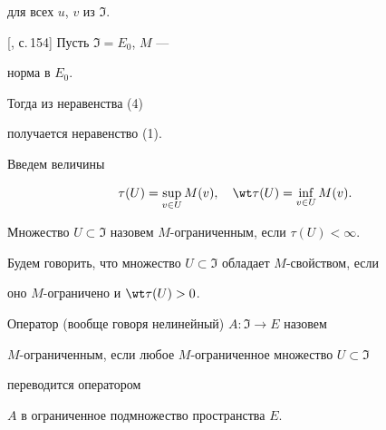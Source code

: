 для всех $u$, $v$ из $\Im$. 


 


\begin{note}%


[{\selectfont [2], с.\,154}] Пусть $\Im=E_0$, $M$ --- 


норма в $E_0$. 


Тогда из неравенства (4) 


получается неравенство (1).  


\end{note} 


 


Введем величины 


$$ 


\tau(U)=\sup_{v\in U}M(v),\quad 


\wt\tau(U)=\inf_{v\in U}M(v). 


$$ 


 


\begin{defn} 


Множество $U\subset\Im$ назовем $M$-ограниченным, если $\tau(U)<\infty$. 


\end{defn} 


 


\begin{defn} 


Будем говорить, что множество $U\subset\Im$ обладает $M$-свойством, если  


оно $M$-ограничено и $\wt\tau(U)>0$. 


\end{defn} 


 


\begin{defn} 


Оператор (вообще говоря нелинейный) $A:\Im\to E$ назовем 


$M$-огра\-ни\-ченн\-ым, если любое $M$-ограниченное множество $U\subset\Im$ 


переводится оператором  


$A$ в ограниченное подмножество пространства $E$. 


\end{defn} 


 


